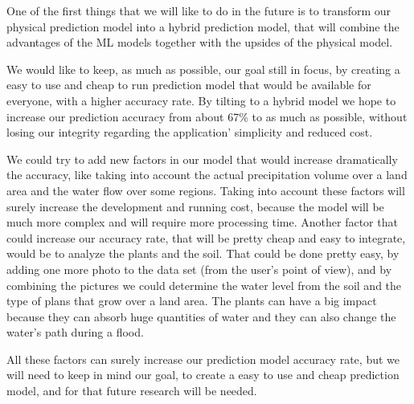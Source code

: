 \documentclass[12pt, a4paper]{report}
\begin{document}
\quad
One of the first things that we will like to do in the future is to transform our physical prediction model into a hybrid prediction model, that will combine the advantages of the ML models together with the upsides of the physical model.
\par 

We would like to keep, as much as possible, our goal still in focus, by creating a easy to use and cheap to run prediction model that would be available for everyone, with a higher accuracy rate. By tilting to a hybrid model we hope to increase our prediction accuracy from about 67\% to as much as possible, without losing our integrity regarding the application' simplicity and reduced cost.
\par

We could try to add new factors in our model that would increase dramatically the accuracy, like taking into account the actual precipitation volume over a land area and the water flow over some regions. Taking into account these factors will surely increase the development and running cost, because the model will be much more complex and will require more processing time. Another factor that could increase our accuracy rate, that will be pretty cheap and easy to integrate, would be to analyze the plants and the soil. That could be done pretty easy, by adding one more photo to the data set (from the user's point of view), and by combining the pictures we could determine the water level from the soil and the type of plans that grow over a land area. The plants can have a big impact because they can absorb huge quantities of water and they can also change the water's path during a flood.
\par 
All these factors can surely increase our prediction model accuracy rate, but we will need to keep in mind our goal, to create a easy to use and cheap prediction model, and for that future research will be needed.




\renewcommand{\bibname}{Bibliography}

\end{document}
